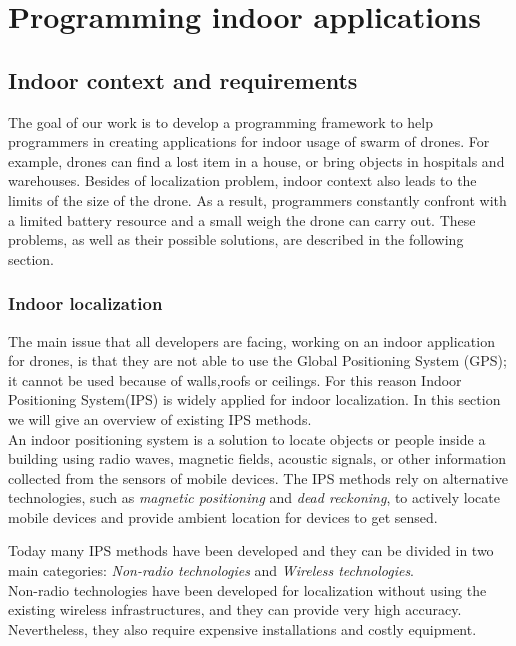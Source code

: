 \chapter{Programming indoor applications}
\label{cap3}



\section {Indoor context and requirements}

The goal of our work is to develop a programming framework to help programmers in creating applications for indoor usage of swarm of drones. For example, drones can find a lost item in a house, or bring objects in hospitals and warehouses.
Besides of localization problem, indoor context also leads to the limits of the size of the drone. As a result, programmers constantly confront with a limited battery resource and a small weigh the drone can carry out. These problems, as well as their possible solutions, are described in the following section.

\subsection{Indoor localization}

The main issue that all developers are facing, working on an indoor application for drones, is that they are not able to use the Global Positioning System (GPS); it cannot be used because of walls,roofs or ceilings.
For this reason Indoor Positioning System(IPS) is widely applied for indoor localization. In this section we will give an overview of existing IPS methods.  
\\

An indoor positioning system is a solution to locate objects or people inside a building using radio waves, magnetic fields, acoustic signals, or other information collected from the sensors of mobile devices.
The IPS methods rely on alternative technologies, such as \textit{magnetic positioning} and \textit{dead reckoning}, to actively locate mobile devices and provide ambient location for devices to get sensed.

Today many IPS methods have been developed and they can be divided in two main categories: \textit{Non-radio technologies} and \textit{Wireless technologies}.
\\

Non-radio technologies have been developed for localization without using the existing wireless infrastructures, and they can provide very high accuracy.
Nevertheless, they also require expensive installations and costly equipment.
\\

